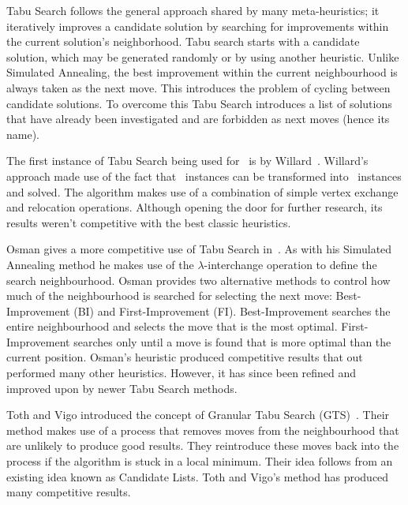 Tabu Search follows the general approach shared by many meta-heuristics; it iteratively improves a candidate solution by searching for improvements within the current solution's neighborhood. Tabu search starts with a candidate solution, which may be generated randomly or by using another heuristic. Unlike Simulated Annealing, the best improvement within the current neighbourhood is always taken as the next move. This introduces the problem of cycling between candidate solutions. To overcome this Tabu Search introduces a list of solutions that have already been investigated and are forbidden as next moves (hence its name).

The first instance of Tabu Search being used for \VRP\ is by Willard~\cite{Willard:1989}. Willard's approach made use of the fact that \VRP\ instances can be transformed into \MTSP\ instances and solved. The algorithm makes use of a combination of simple vertex exchange and relocation operations. Although opening the door for further research, its results weren't competitive with the best classic heuristics. 

Osman gives a more competitive use of Tabu Search in~\cite{Osman:1993}. As with his Simulated Annealing method he makes use of the $\lambda$-interchange operation to define the search neighbourhood. Osman provides two alternative methods to control how much of the neighbourhood is searched for selecting the next move: Best-Improvement (BI) and First-Improvement (FI). Best-Improvement searches the entire neighbourhood and selects the move that is the most optimal. First-Improvement searches only until a move is found that is more optimal than the current position. Osman's heuristic produced competitive results that out performed many other heuristics. However, it has since been refined and improved upon by newer Tabu Search methods.

Toth and Vigo introduced the concept of Granular Tabu Search (GTS)~\cite{GHL:1998}. Their method makes use of a process that removes moves from the neighbourhood that are unlikely to produce good results. They reintroduce these moves back into the process if the algorithm is stuck in a local minimum. Their idea follows from an existing idea known as Candidate Lists. Toth and Vigo's method has produced many competitive results.

